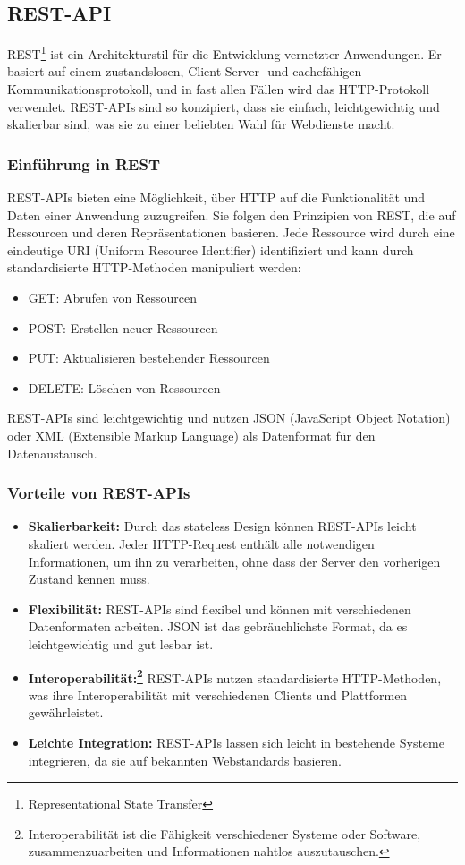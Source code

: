 \subsection{REST-API}

REST\footnote{Representational State Transfer} ist ein Architekturstil für die Entwicklung vernetzter Anwendungen. Er basiert auf einem zustandslosen, Client-Server- und cachefähigen Kommunikationsprotokoll, und in fast allen Fällen wird das HTTP-Protokoll verwendet. REST-APIs sind so konzipiert, dass sie einfach, leichtgewichtig und skalierbar sind, was sie zu einer beliebten Wahl für Webdienste macht.

\subsubsection{Einführung in REST}
REST-APIs bieten eine Möglichkeit, über HTTP auf die Funktionalität und Daten einer Anwendung zuzugreifen. Sie folgen den Prinzipien von REST, die auf Ressourcen und deren Repräsentationen basieren. Jede Ressource wird durch eine eindeutige URI (Uniform Resource Identifier) identifiziert und kann durch standardisierte HTTP-Methoden manipuliert werden:
\begin{itemize}
	\item GET: Abrufen von Ressourcen
	\item POST: Erstellen neuer Ressourcen
	\item PUT: Aktualisieren bestehender Ressourcen
	\item DELETE: Löschen von Ressourcen
\end{itemize}
REST-APIs sind leichtgewichtig und nutzen JSON (JavaScript Object Notation) oder XML (Extensible Markup Language) als Datenformat für den Datenaustausch.

\subsubsection{Vorteile von REST-APIs}

\begin{itemize}
	\item \textbf{Skalierbarkeit:} Durch das stateless Design können REST-APIs leicht skaliert werden. Jeder HTTP-Request enthält alle notwendigen Informationen, um ihn zu verarbeiten, ohne dass der Server den vorherigen Zustand kennen muss.
	\item \textbf{Flexibilität:} REST-APIs sind flexibel und können mit verschiedenen Datenformaten arbeiten. JSON ist das gebräuchlichste Format, da es leichtgewichtig und gut lesbar ist.
	\item \textbf{Interoperabilität:\footnote{Interoperabilität ist die Fähigkeit verschiedener Systeme oder Software, zusammenzuarbeiten und Informationen nahtlos auszutauschen\cite{wiki:listing}.}} REST-APIs nutzen standardisierte HTTP-Methoden, was ihre Interoperabilität mit verschiedenen Clients und Plattformen gewährleistet.
	\item \textbf{Leichte Integration:} REST-APIs lassen sich leicht in bestehende Systeme integrieren, da sie auf bekannten Webstandards basieren.
\end{itemize}

